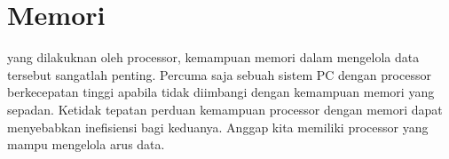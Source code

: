 \section{Memori}
yang dilakuknan oleh processor, kemampuan memori dalam mengelola data tersebut sangatlah penting. Percuma saja sebuah sistem PC dengan processor berkecepatan tinggi apabila tidak diimbangi dengan kemampuan memori yang sepadan. Ketidak tepatan perduan kemampuan processor dengan memori dapat menyebabkan inefisiensi bagi keduanya. Anggap kita memiliki processor yang mampu mengelola arus data.